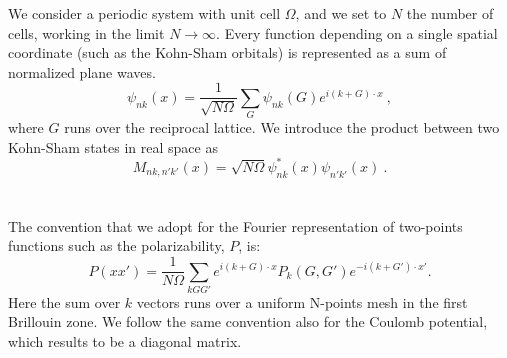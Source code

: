 \documentclass[11pt]{article}
\begin{document}
We consider a periodic system with unit cell $\Omega$,
and we set to $N$ the number of cells, working in the
limit $N\rightarrow\infty$.
Every function depending on a single spatial coordinate (such as
the Kohn-Sham orbitals) is represented as a sum of normalized plane waves.
\begin{equation}
\psi_{nk}(x) = \frac{1}{\sqrt{N\Omega}} \sum_G \psi_{nk}(G) e^{i(k+G)\cdot x}~,
\end{equation}
where $G$ runs over the reciprocal lattice.
We introduce the product between two Kohn-Sham states in real space as
\begin{equation}
M_{nk,n'k'}(x) = \sqrt{N\Omega} \psi^*_{nk}(x) \psi_{n'k'}(x)~.
\end{equation}
\\
\\
The convention that we adopt for the Fourier representation of two-points functions such as the polarizability, $P$, is:
\begin{equation}\label{eq:block-diagonal-operators}
P(xx') = \frac{1}{N\Omega} \sum_{kGG'}
e^{i(k+G)\cdot x} P_k(G,G') e^{-i(k+G')\cdot x'}.
\end{equation}
Here the sum over $k$ vectors runs over a uniform N-points mesh in
the first Brillouin zone.
We follow the same convention also for the Coulomb potential,
which results to be a diagonal matrix.
\end{document}
